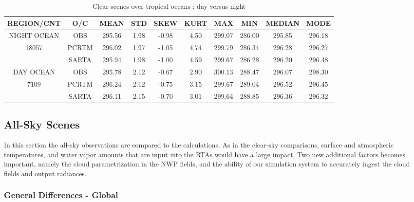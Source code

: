 \documentclass[agupp]{aguplus}              %
\begin{document}
\begin{article}
\begin{center}
\begin{table}[ht]
{\small
\hfill{}
\begin{tabular}{cccccccccc} %
\hline\hline %
  REGION/CNT    & O/C & MEAN  & STD & SKEW & KURT & MAX & MIN & MEDIAN & MODE \\
\hline
NIGHT OCEAN   & OBS   & 295.56 &  1.98  & -0.98 &  4.50 & 299.07 & 286.00 & 295.85 & 296.18 \\
   18057        & PCRTM & 296.02 &  1.97  & -1.05 &  4.74 & 299.79 & 286.34 & 296.28 & 296.27 \\
              & SARTA & 295.94 &  1.98  & -1.00 &  4.59 & 299.67 & 286.28 & 296.20 & 296.48 \\
\hline
DAY OCEAN   & OBS   & 295.78 &  2.12  & -0.67 &  2.90 & 300.13 & 288.47 & 296.07 & 298.30 \\
   7109      & PCRTM & 296.24 &  2.12  & -0.75 &  3.15 & 299.67 & 289.04 & 296.52 & 296.45 \\
            & SARTA & 296.11 &  2.15  & -0.70 &  3.01 & 299.64 & 288.85 & 296.36 & 296.32 \\
\hline %
\end{tabular}}
\hfill{}
\caption{Clear scenes over tropical oceans : day versus night}
\label{table:clear1} %
\end{table}
\end{center}

\subsection{All-Sky Scenes}

In this section the all-sky observations are compared to the
calculations.  As in the clear-sky comparisons, surface and atmospheric
temperatures, and water vapor amounts that are input into the RTAs
would have a large impact. Two new additional factors becomes
important, namely the cloud parametrization in the NWP fields, and the
ability of our simulation system to accurately ingest the cloud fields
and output radiances.

\subsubsection{General Differences - Global}


\end{article}
\end{document}
